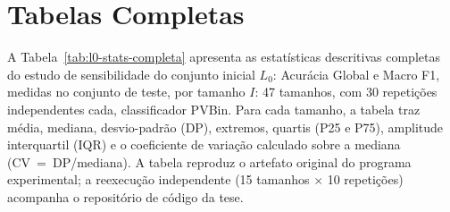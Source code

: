 \chapter{Tabelas Completas}
\label{ap:tabelas}

A Tabela~\ref{tab:l0-stats-completa} apresenta as estatísticas descritivas
completas do estudo de sensibilidade do conjunto inicial $L_0$: Acurácia
Global e Macro F1, medidas no conjunto de teste, por tamanho $I$: 47
tamanhos, com 30 repetições independentes cada, classificador PVBin. Para
cada tamanho, a tabela traz média, mediana, desvio-padrão (DP), extremos,
quartis (P25 e P75), amplitude interquartil (IQR) e o coeficiente de
variação calculado sobre a mediana (CV~=~DP/mediana). A tabela reproduz o
artefato original do programa experimental; a reexecução independente
(15 tamanhos $\times$ 10 repetições) acompanha o repositório de código da
tese.

